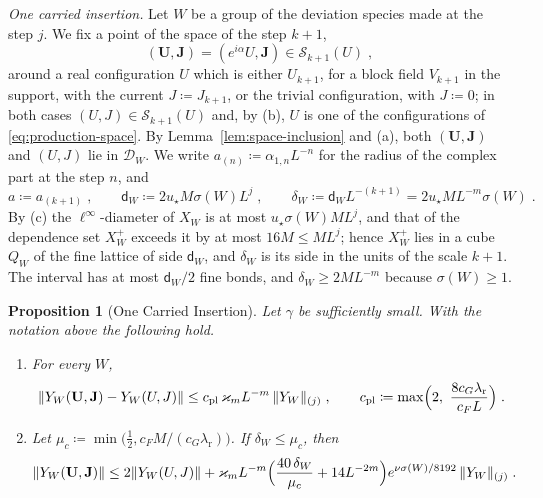 \documentclass[11pt]{preprint}
\DeclarePairedDelimiter{\norm}{\lVert}{\rVert}
\numberwithin{equation}{section}
\newtheorem{proposition}[theorem]{Proposition}
\theoremstyle{definition}
\theoremstyle{remark}
\theoremstyle{plain}
\begin{document}
\emph{One carried insertion.} Let $W$ be a group of the deviation species made at the step $j$. We fix a point of the space of the step $k + 1$,
\begin{equation}\label{eq:carried-datum}
    (\mathbf U, \mathbf J) = (e^{i\alpha}U, \mathbf J) \in \mathcal S_{k+1}(U)\;,
\end{equation}
around a real configuration $U$ which is either $U_{k+1}$, for a block field $V_{k+1}$ in the support, with the current $J \coloneqq J_{k+1}$, or the trivial configuration, with $J \coloneqq 0$; in both cases $(U, J) \in \mathcal S_{k+1}(U)$ and, by (b), $U$ is one of the configurations of \eqref{eq:production-space}. By Lemma~\ref{lem:space-inclusion} and (a), both $(\mathbf U, \mathbf J)$ and $(U, J)$ lie in $\mathcal D_W$. We write $a_{(n)} \coloneqq \alpha_{1,n}L^{-n}$ for the radius of the complex part at the step $n$, and
\begin{equation}\label{eq:carried-sizes}
    a \coloneqq a_{(k+1)}\;,
    \qquad
    \mathsf d_W \coloneqq 2u_\star M\sigma(W)L^j\;,
    \qquad
    \delta_W \coloneqq \mathsf d_WL^{-(k+1)} = 2u_\star ML^{-m}\sigma(W)\;.
\end{equation}
By (c) the $\ell^\infty$-diameter of $X_W$ is at most $u_\star\sigma(W)ML^j$, and that of the dependence set $X^+_W$ exceeds it by at most $16M \leq ML^j$; hence $X^+_W$ lies in a cube $Q_W$ of the fine lattice of side $\mathsf d_W$, and $\delta_W$ is its side in the units of the scale $k + 1$. The interval has at most $\mathsf d_W/2$ fine bonds, and $\delta_W \geq 2ML^{-m}$ because $\sigma(W) \geq 1$.

\begin{proposition}[One Carried Insertion]\label{prop:one-carried}
Let $\gamma$ be sufficiently small. With the notation above the following hold.
\begin{enumerate}[label=(\roman*)]
\item For every $W$,
\begin{equation}\label{eq:excess-plain}
    \norm{Y_W(\mathbf U, \mathbf J) - Y_W(U, J)} \leq c_{\mathrm{pl}}\,\varkappa_mL^{-m}\,\norm{Y_W}_{(j)}\;,
    \qquad
    c_{\mathrm{pl}} \coloneqq \max\Bigl(2,\ \frac{8c_G\lambda_{\mathrm r}}{c_FL}\Bigr)\;.
\end{equation}
\item Let $\mu_c \coloneqq \min\bigl(\frac12, c_FM/(c_G\lambda_{\mathrm r})\bigr)$. If $\delta_W \leq \mu_c$, then
\begin{equation}\label{eq:excess-covariant}
    \norm{Y_W(\mathbf U, \mathbf J)} \leq 2\norm{Y_W(U, J)} + \varkappa_mL^{-m}\Bigl(\frac{40\,\delta_W}{\mu_c} + 14L^{-2m}\Bigr)e^{\nu\sigma(W)/8192}\,\norm{Y_W}_{(j)}\;.
\end{equation}
\end{enumerate}
\end{proposition}
\end{document}

